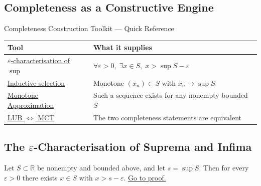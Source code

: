 
\subsection{Completeness as a Constructive Engine}
\label{sec:completeness-construction}

\begin{toolkitbox}{Completeness Construction Toolkit --- Quick Reference}
\small
\begin{tabular}{l l}
\toprule
\textbf{Tool}  & \textbf{What it supplies} \\
\midrule
\hyperref[prop:eps-char-sup]{$\varepsilon$-characterisation of $\sup$}
   & $\forall\varepsilon>0,\;\exists x\in S,\;x>\sup S-\varepsilon$
  \\[3pt]
\hyperref[thm:inductive-selection]{Inductive selection}
   & Monotone $(x_n)\subset S$ with $x_n\to\sup S$
  \\[3pt]
\hyperref[prop:monotone-approx-bounds]{Monotone Approximation}
   & Such a sequence exists for any nonempty bounded $S$
  \\[3pt]
\hyperref[thm:LUB-iff-MCT]{LUB $\Leftrightarrow$ MCT}
   & The two completeness statements are equivalent
  \\
\bottomrule
\end{tabular}
\end{toolkitbox}

\subsection*{\texorpdfstring{The $\varepsilon$-Characterisation of Suprema and Infima}{The epsilon-Characterisation of Suprema and Infima}}
\label{subsec:eps-char}

\begin{proposition}
\label{prop:eps-char-sup}
Let $S\subset\mathbb{R}$ be nonempty and bounded above, and let
$s=\sup S$. Then for every $\varepsilon>0$ there exists $x\in S$ with
$x>s-\varepsilon$.
\hyperref[prf:eps-char-sup]{Go to proof.}
\end{proposition}

\begin{remark*}
\end{remark*}


